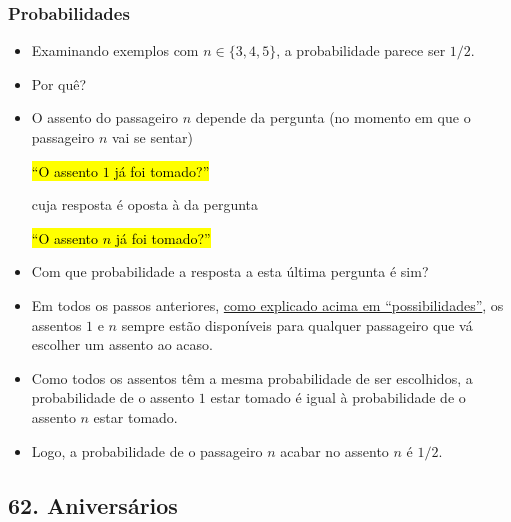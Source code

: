 \documentclass[
  11pt]{report}
\begin{document}
\hypertarget{probabilidades}{%
\subsubsection*{Probabilidades}\label{probabilidades}}

\begin{itemize}
\item
  Examinando exemplos com $n \in \{3, 4, 5\}$, a probabilidade parece ser $1/2$.
\item
  Por quê?
\item
  O assento do passageiro $n$ depende da pergunta (no momento em que o passageiro $n$ vai se sentar)

  {\hl{``O assento $1$ já foi tomado?''}}

  cuja resposta é oposta à da pergunta

  {\hl{``O assento $n$ já foi tomado?''}}
\item
  Com que probabilidade a resposta a esta última pergunta é sim?
\item
  Em todos os passos anteriores, \protect\hyperlink{possibilidades}{como explicado acima em ``possibilidades''}, os assentos $1$ e $n$ sempre estão disponíveis para qualquer passageiro que vá escolher um assento ao acaso.
\item
  Como todos os assentos têm a mesma probabilidade de ser escolhidos, a probabilidade de o assento $1$ estar tomado é igual à probabilidade de o assento $n$ estar tomado.
\item
  Logo, a probabilidade de o passageiro $n$ acabar no assento $n$ é $1/2$.
\end{itemize}

\hypertarget{aniversuxe1rios}{%
\subsection*{62. Aniversários}\label{aniversuxe1rios}}
\end{document}
